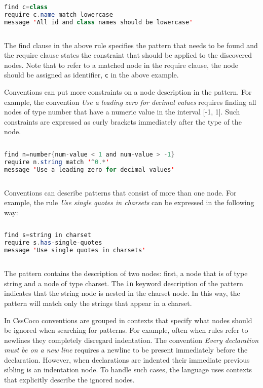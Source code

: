 \begin{sourcecode}
\begin{lstlisting}[style=mono,language=Java]
find c=class
require c.name match lowercase
message 'All id and class names should be lowercase'
\end{lstlisting}
\end{sourcecode}

The find clause in the above rule specifies the pattern that needs to be found and the require
clause states the constraint that should be applied to the discovered nodes. Note that to refer to a
matched node in the require clause, the node should be assigned as identifier, \texttt{c} in the
above example.

Conventions can put more constraints on a node description in the pattern. For example, the
convention \textit{Use a leading zero for decimal values} requires finding all nodes of type number
that have a numeric value in the interval [-1, 1]. Such constraints are expressed as curly brackets
immediately after the type of the node.

\begin{sourcecode}
\begin{lstlisting}[style=mono,language=Java]
find n=number{num-value < 1 and num-value > -1}
require n.string match '^0.*'
message 'Use a leading zero for decimal values'
\end{lstlisting}
\end{sourcecode}

Conventions can describe patterns that consist of more than one node. For example, the rule
\textit{Use single quotes in charsets} can be expressed in the following way:

\begin{sourcecode}
\begin{lstlisting}[style=mono,language=Java]
find s=string in charset
require s.has-single-quotes
message 'Use single quotes in charsets'
\end{lstlisting}
\end{sourcecode}

The pattern contains the description of two nodes: first, a node that is of type string and a node
of type charset. The \texttt{in} keyword description of the pattern indicates that the string node
is nested in the charset node. In this way, the pattern will match only the strings that appear in a
charset.

In CssCoco conventions are grouped in contexts that specify what nodes should be ignored when
searching for patterns. For example, often when rules refer to newlines they completely disregard
indentation. The convention \textit{Every declaration must be on a new line} requires a newline to
be present immediately before the declaration. However, when declarations are indented their
immediate previous sibling is an indentation node. To handle such cases, the language uses contexts
that explicitly describe the ignored nodes.


